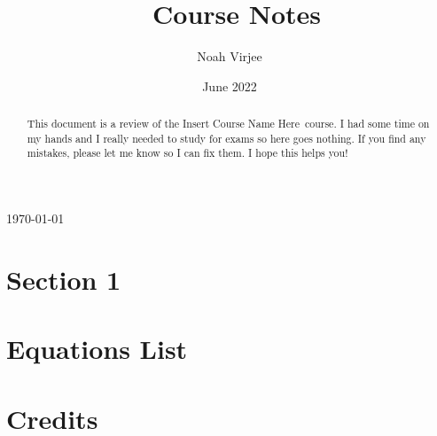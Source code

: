 \documentclass{article}
\title{\code\ Course Notes}
\author{Noah Virjee}
\date{June 2022}
\newcommand{\name}{Insert Course Name Here}
\begin{document}
\noindent\parbox{\linewidth}{ %
\parbox{.7\linewidth}{\fontsize{24}{28}\selectfont\thetitle}\hfill%
\parbox{.3\linewidth}{\fontsize{12}{14}\selectfont\raggedleft\today\\\theauthor%
}}

\begin{abstract}
This document is a review of the \name\ course. I had some time on my hands and I really needed to study for exams so here goes nothing. If you find any mistakes, please let me know so I can fix them. I hope this helps you!
\end{abstract}

\tableofcontents
\pagebreak

\section{Section 1}

\pagebreak
\appendix
\section{Equations List}


\pagebreak
\section{Credits}
\end{document}
